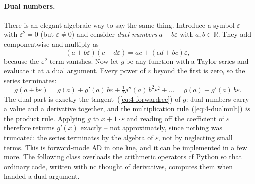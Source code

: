 \paragraph{Dual numbers.}
There is an elegant algebraic way to say the same thing.  Introduce a symbol
$\varepsilon$ with $\varepsilon^{2}=0$ (but $\varepsilon\neq0$) and consider
\emph{dual numbers} $a+b\varepsilon$ with $a,b\in\mathbb{R}$.  They add
componentwise and multiply as
\begin{equation}
  (a+b\varepsilon)(c+d\varepsilon) = ac + (ad+bc)\varepsilon ,
  \label{eq:4-dualmult}
\end{equation}
because the $\varepsilon^{2}$ term vanishes.  Now let $g$ be any function with
a Taylor series and evaluate it at a dual argument.  Every power of
$\varepsilon$ beyond the first is zero, so the series terminates:
\begin{equation}
  g(a+b\varepsilon) = g(a) + g'(a)\,b\varepsilon
     + \tfrac{1}{2}g''(a)\,b^{2}\varepsilon^{2}+\dots
     = g(a) + g'(a)\,b\varepsilon .
  \label{eq:4-dualtaylor}
\end{equation}
The dual part is exactly the tangent~(\ref{eq:4-forwardrec}) of $g$: dual
numbers carry a value and a derivative together, and the multiplication
rule~(\ref{eq:4-dualmult}) \emph{is} the product rule.  Applying $g$ to
$x+1\cdot\varepsilon$ and reading off the coefficient of $\varepsilon$
therefore returns $g'(x)$ exactly -- not approximately, since nothing was
truncated: the series terminates by the algebra of $\varepsilon$, not by
neglecting small terms.  This is forward-mode AD in one line, and it can be
implemented in a few more.  The following class overloads the arithmetic
operators of Python so that ordinary code, written with no thought of
derivatives, computes them when handed a dual argument.

